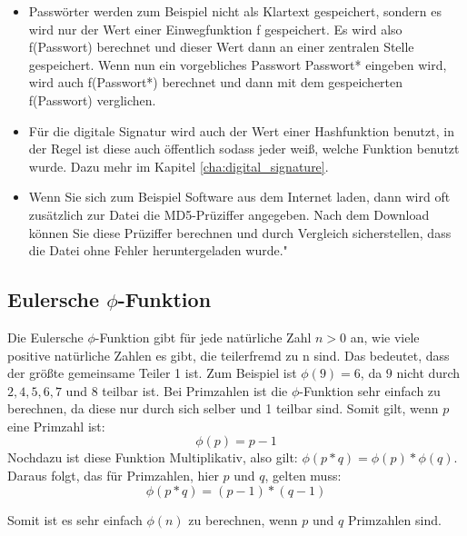 \documentclass[12pt,a4paper]{scrartcl}
\begin{document}
	\begin{itemize}
	\item Passwörter werden zum Beispiel nicht als Klartext gespeichert, sondern es wird nur der Wert einer Einwegfunktion f gespeichert. Es wird also f(Passwort) berechnet und dieser Wert dann an einer zentralen Stelle gespeichert. Wenn nun ein vorgebliches Passwort Passwort* eingeben wird, wird auch f(Passwort*) berechnet und dann mit dem gespeicherten f(Passwort) verglichen. \cite[S.22]{Beutelspacher2015-jl}
	
	\item Für die digitale Signatur wird auch der Wert einer Hashfunktion benutzt, in der Regel ist diese auch öffentlich sodass jeder weiß, welche Funktion benutzt wurde. Dazu mehr im Kapitel \ref{cha:digital_signature}. \cite[S.16]{Beutelspacher2015-jl}
	
	\item \glqq Wenn Sie sich zum Beispiel Software aus dem Internet laden, dann wird oft zusätzlich zur Datei die MD5-Prüziffer angegeben. Nach dem Download können Sie diese Prüziffer berechnen und durch Vergleich sicherstellen, dass die Datei ohne Fehler heruntergeladen wurde." \cite[S.81]{teschl2008mathematik}
	\end{itemize}
	
	\label{ch:einweg}
	\subsection{Eulersche $\phi$-Funktion}
	\label{cha:phi}
	
	Die Eulersche $\phi$-Funktion gibt für jede natürliche Zahl ${n > 0}$ an, wie viele positive natürliche Zahlen es gibt, die teilerfremd zu n sind. Das bedeutet, dass der größte gemeinsame Teiler 1 ist. \cite[S.106]{teschl2008mathematik} Zum Beispiel ist ${\phi(9) = 6}$, da ${9}$ nicht durch ${2, 4, 5, 6, 7 }$ und $8$ teilbar ist. Bei Primzahlen ist die $\phi$-Funktion sehr einfach zu berechnen, da diese nur durch sich selber und 1 teilbar sind. Somit gilt, wenn $p$ eine Primzahl ist: $${\phi(p) = p - 1}$$
	Nochdazu ist diese Funktion Multiplikativ, also gilt: ${\phi(p * q) = \phi(p) * \phi(q)}$.
	Daraus folgt, das für Primzahlen, hier $p$ und $q$, gelten muss:
	$${\phi(p * q) = (p - 1) * (q - 1)}$$
	
	Somit ist es sehr einfach $\phi(n)$ zu berechnen, wenn $p$ und $q$ Primzahlen sind.
		
\end{document}
